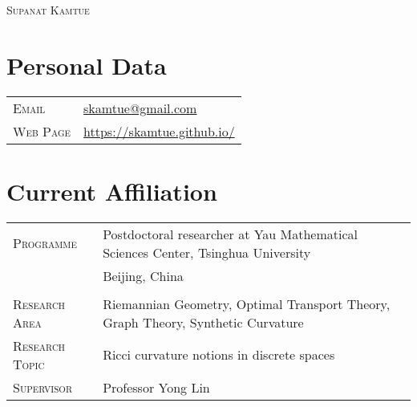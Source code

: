 \documentclass[a4paper,10pt]{article}
\begin{document}
\pagestyle{empty} %


\par{\centering
		{\huge \textsc{Supanat Kamtue}
	}\bigskip\par}

\section{Personal Data}

\begin{tabular}{p{2.5cm} l}
    \textsc{Email}     &  \href{mailto:skamtue@gmail.com}{skamtue@gmail.com}\\ [0.7ex]
    \textsc{Web Page}     &  \href{https://skamtue.github.io/}{https://skamtue.github.io/}
\end{tabular}

\section{Current Affiliation}

\begin{tabular}{p{2.7cm} l}
\textsc{Programme}& Postdoctoral researcher at Yau Mathematical Sciences Center, Tsinghua University\\ 
& Beijing, China\\&\\
\textsc{Research Area} & Riemannian Geometry, Optimal Transport Theory, Graph Theory, Synthetic Curvature\\ [4ex]
\textsc{Research Topic} & Ricci curvature notions in discrete spaces\\ [4ex]
\textsc{Supervisor} & Professor Yong Lin
\end{tabular}

\end{document}
